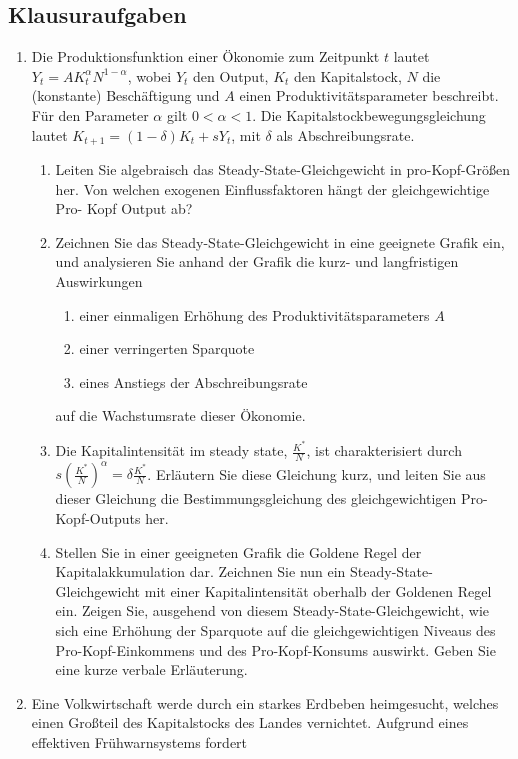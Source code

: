 \documentclass{scrartcl}
\begin{document}
\subsection{Klausuraufgaben}
\begin{enumerate}
\item Die Produktionsfunktion einer \"{O}konomie zum Zeitpunkt $t$ lautet $Y_t = AK_t^\alpha N^{1-\alpha}$, wobei $Y_t$ den Output,
$K_t$ den Kapitalstock, $N$ die (konstante) Besch\"{a}ftigung und $A$ einen Produktivit\"{a}tsparameter beschreibt. F\"{u}r den Parameter $\alpha$ gilt $0 < \alpha < 1$. Die Kapitalstockbewegungsgleichung
lautet $K_{t+1} = (1-\delta)K_t + s Y_t$, mit $\delta$ als Abschreibungsrate.
\begin{enumerate}
\item Leiten Sie algebraisch das Steady-State-Gleichgewicht in pro-Kopf-Gr\"{o}{\ss}en her. Von welchen exogenen Einflussfaktoren h\"{a}ngt der gleichgewichtige Pro- Kopf Output ab?
\item Zeichnen Sie das Steady-State-Gleichgewicht in eine geeignete Grafik ein, und analysieren Sie anhand der Grafik die kurz- und langfristigen Auswirkungen
    \begin{enumerate}
    \item einer einmaligen Erh\"{o}hung des Produktivit\"{a}tsparameters $A$
    \item einer verringerten Sparquote
    \item eines Anstiegs der Abschreibungsrate
    \end{enumerate}
    auf die Wachstumsrate dieser \"{O}konomie.
\item Die Kapitalintensit\"{a}t im steady state, $\frac{K^*}{N}$, ist charakterisiert durch $s\left(\frac{K^*}{N}\right)^\alpha = \delta\frac{K^*}{N}$. Erl\"{a}utern Sie diese Gleichung kurz, und leiten Sie aus dieser Gleichung die Bestimmungsgleichung des gleichgewichtigen Pro-Kopf-Outputs her.
\item Stellen Sie in einer geeigneten Grafik die Goldene Regel der Kapitalakkumulation dar. Zeichnen Sie nun ein Steady-State-Gleichgewicht mit einer Kapitalintensit\"{a}t oberhalb der Goldenen Regel ein. Zeigen Sie, ausgehend von diesem Steady-State-Gleichgewicht, wie sich eine Erh\"{o}hung der Sparquote auf die gleichgewichtigen Niveaus des Pro-Kopf-Einkommens und des Pro-Kopf-Konsums auswirkt. Geben Sie eine kurze verbale Erl\"{a}uterung.
\end{enumerate}
\item Eine Volkwirtschaft werde durch ein starkes Erdbeben heimgesucht, welches einen Großteil des Kapitalstocks des Landes vernichtet. Aufgrund eines effektiven Frühwarnsystems fordert

\end{enumerate}
\end{document}
